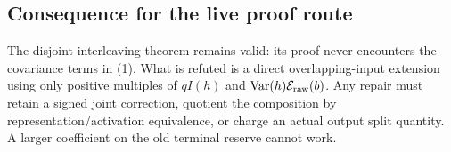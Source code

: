 \subsection*{Consequence for the live proof route}

The disjoint interleaving theorem remains valid: its proof never encounters
the covariance terms in (1).  What is refuted is a direct overlapping-input
extension using only positive multiples of \(qI(h)\) and
\(\operatorname{Var}(h)\mathcal E_{\rm raw}(b)\).  Any repair must retain a
signed joint correction, quotient the composition by representation/activation
equivalence, or charge an actual output split quantity.  A larger coefficient
on the old terminal reserve cannot work.
